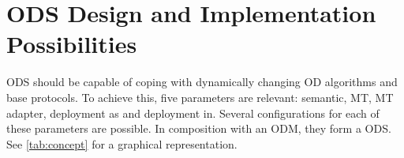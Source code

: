 \section{ODS Design and Implementation Possibilities}
\label{sec:concecptOverview}
ODS should be capable of coping with dynamically changing OD algorithms and base protocols. To achieve this, five parameters are relevant: semantic, MT, MT adapter, deployment as and deployment in. Several configurations for each of these parameters are possible. In composition with an ODM, they form a ODS. See \ref{tab:concept} for a graphical representation.\\

    
    



